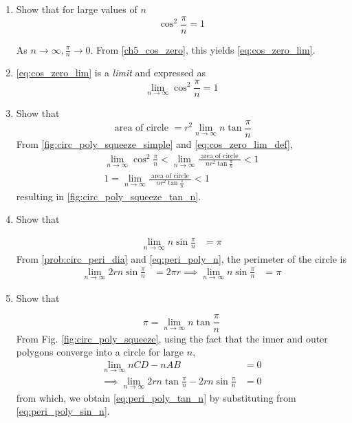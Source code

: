 \begin{enumerate}[label=\arabic*.,ref=\thesubsection.\theenumi]
\item
	Show that for large values of $n$
	\begin{equation}
\label{eq:cos_zero_lim}
\cos^2\frac{\pi}{n} = 1
%
	\end{equation}	

%
\solution  As $n \to \infty, \frac{\pi}{n} \to 0$. From \eqref{ch5_cos_zero}, this yields \eqref{eq:cos_zero_lim}.

%
\item  \eqref{eq:cos_zero_lim} is a {\em limit} and 
	 expressed as 
%
\begin{equation}
\label{eq:cos_zero_lim_def}
\lim_{n \rightarrow \infty}\cos^2\frac{\pi}{n} = 1
\end{equation}
%	

\item
	Show that 
\begin{equation}
\label{fig:circ_poly_squeeze_tan_n}
\text{ area of circle } = r^2\lim_{n \rightarrow \infty}
{n\tan\frac{\pi}{n}} 
\end{equation}	
\solution From \eqref{fig:circ_poly_squeeze_simple} and \eqref{eq:cos_zero_lim_def}, 
	\begin{align}
\lim_{n\to \infty}\cos^2\frac{\pi}{n} < \lim_{n\to \infty} \frac{\text{ area of circle }}{nr^{2}\tan\frac{\pi}{n}} < 1	
\\
1 = \lim_{n\to \infty} \frac{\text{ area of circle }}{nr^{2}\tan\frac{\pi}{n}} < 1	
\end{align}
resulting in \eqref{fig:circ_poly_squeeze_tan_n}.
%
\item Show that 

	\begin{align}
\label{eq:peri_poly_sin_n}
 \lim_{n\to \infty}n \sin\frac{\pi}{n} &= \pi 
\end{align}
%
\solution From \eqref{prob:circ_peri_dia} and \eqref{eq:peri_poly_n}, the perimeter of the circle is 
%
\begin{align}
\lim_{n\to \infty}2rn \sin\frac{\pi}{n} &= 2\pi r
\implies \lim_{n\to \infty}n \sin\frac{\pi}{n} &= \pi 
\end{align} 
\item Show that 

	\begin{equation}
\label{eq:peri_poly_tan_n}
	\pi = \lim_{n \rightarrow \infty}
	{n\tan\frac{\pi}{n}}
	\end{equation}
\solution 
%
From Fig. \eqref{fig:circ_poly_squeeze}, using the fact that the inner and outer polygons converge into a circle for large $n$,
\begin{align}
\lim_{n\to \infty} nCD -nAB &= 0
\\
\implies \lim_{n\to \infty} 2r n\tan\frac{\pi}{n}-2r n\sin\frac{\pi}{n} &= 0
\end{align}
%
from which, we obtain \eqref{eq:peri_poly_tan_n}
by substituting from \eqref{eq:peri_poly_sin_n}.



\end{enumerate}
